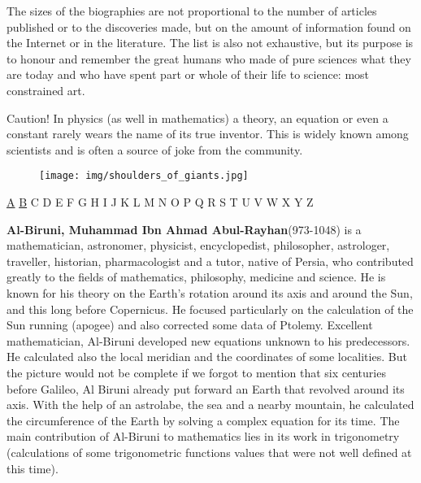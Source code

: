 The sizes of the biographies are not proportional to the number of articles published or to the discoveries made, but on the amount of information found on the Internet or in the literature. The list is also not exhaustive, but its purpose is to honour and remember the great humans who made of pure sciences what they are today and who have spent part or whole of their life to science: most constrained art.

Caution! In physics (as well in mathematics) a theory, an equation or even a constant rarely wears the name of its true inventor. This is widely known among scientists and is often a source of joke from the community.

	\begin{figure}[H]
		\centering
		\texttt{[image: img/shoulders\_of\_giants.jpg]}	
	\end{figure}

\begin{center}
\hyperref[sec:A]{A} \hyperref[sec:B]{B} C D E F G H I J K L M N O P Q R S T U V W X Y Z
\end{center}

{}
\label{sec:A}
		
\pichskip{15pt}%
\textbf{Al-Biruni, Muhammad Ibn Ahmad Abul-Rayhan}(973-1048) is a mathematician, astronomer, physicist, encyclopedist, philosopher, astrologer, traveller, historian, pharmacologist and a tutor, native of Persia, who contributed greatly to the fields of mathematics, philosophy, medicine and science. He is known for his theory on the Earth's rotation around its axis and around the Sun, and this long before Copernicus. He focused particularly on the calculation of the Sun running (apogee) and also corrected some data of Ptolemy. Excellent mathematician, Al-Biruni developed new equations unknown to his predecessors. He calculated also the local meridian and the coordinates of some localities. But the picture would not be complete if we forgot to mention that six centuries before Galileo, Al Biruni already put forward an Earth that revolved around its axis. With the help of an astrolabe, the sea and a nearby mountain, he calculated the circumference of the Earth by solving a complex equation for its time. The main contribution of Al-Biruni to mathematics lies in its work in trigonometry (calculations of some trigonometric functions values that were not well defined at this time).

